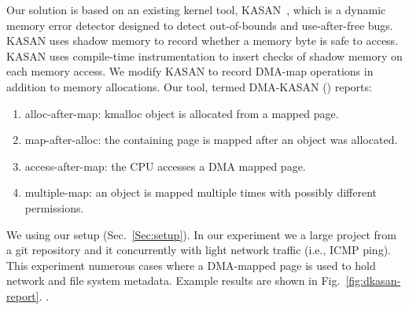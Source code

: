 Our solution is based on an existing kernel tool, KASAN~\cite{kasan}, which is a dynamic memory error detector designed to detect out-of-bounds and use-after-free bugs. KASAN uses shadow memory to record whether a memory byte is safe to access. KASAN uses compile-time instrumentation to insert checks of shadow memory on each memory access. 
We modify KASAN to record DMA-map operations in addition to memory allocations. Our tool, termed DMA-KASAN (\dkasan) reports: 
\begin{enumerate}
    \item alloc-after-map:  kmalloc object is allocated from a mapped page.
    \item map-after-alloc:  the containing page is mapped after an object was allocated.
    \item access-after-map: the CPU accesses a DMA mapped page.
    \item multiple-map: an object is mapped multiple times with possibly different permissions.
\end{enumerate}
We \DIFdelbegin {}\DIFdelend \DIFaddbegin {}\DIFaddend \dkasan using our setup (Sec.~\ref{Sec:setup}).
In our experiment we \DIFdelbegin {}\DIFdelend \DIFaddbegin {}\DIFaddend a large project from a git repository and \DIFdelbegin {}\DIFdelend \DIFaddbegin {}\DIFaddend it concurrently with light network traffic (i.e., ICMP ping). This experiment \DIFdelbegin {}\DIFdelend \DIFaddbegin {}\DIFaddend numerous cases where a DMA-mapped page is used to hold network and file system metadata. Example results are shown in Fig.~\ref{fig:dkasan-report}. \DIFdelbegin {}\DIFdelend \DIFaddbegin {}\DIFaddend .

